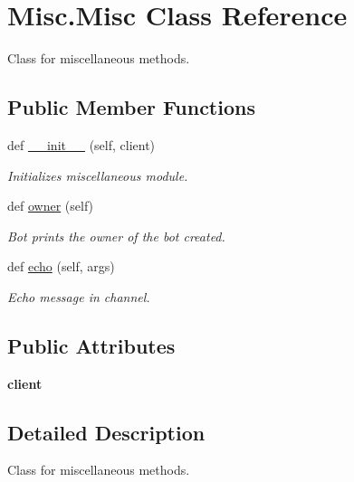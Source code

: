 \hypertarget{class_misc_1_1_misc}{}\section{Misc.\+Misc Class Reference}
\label{class_misc_1_1_misc}


Class for miscellaneous methods.  


\subsection*{Public Member Functions}
\begin{DoxyCompactItemize}
\item 
\mbox{\label{class_misc_1_1_misc_a04c1a1213772d9b80c1b7c6990040fa5}} 
def \mbox{\hyperlink{class_misc_1_1_misc_a04c1a1213772d9b80c1b7c6990040fa5}{\+\_\+\+\_\+init\+\_\+\+\_\+}} (self, client)
\begin{DoxyCompactList}\small\item\em Initializes miscellaneous module. \end{DoxyCompactList}\item 
def \mbox{\hyperlink{class_misc_1_1_misc_aef5ad8708eed0ead94b399a544548017}{owner}} (self)
\begin{DoxyCompactList}\small\item\em Bot prints the owner of the bot created. \end{DoxyCompactList}\item 
def \mbox{\hyperlink{class_misc_1_1_misc_a03ff1d15d2b03eecb821bf7161e31889}{echo}} (self, args)
\begin{DoxyCompactList}\small\item\em Echo message in channel. \end{DoxyCompactList}\end{DoxyCompactItemize}
\subsection*{Public Attributes}
\begin{DoxyCompactItemize}
\item 
\mbox{\label{class_misc_1_1_misc_ae0af6521dd43736d75a2eb0b86c26b00}} 
{\bfseries client}
\end{DoxyCompactItemize}


\subsection{Detailed Description}
Class for miscellaneous methods. 


